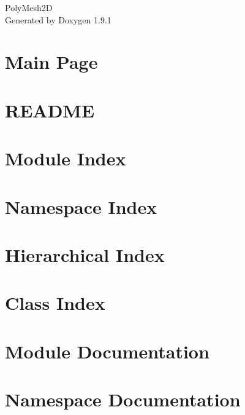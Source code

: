 \let\mypdfximage\pdfximage\def\pdfximage{\immediate\mypdfximage}\documentclass[twoside]{book}
\newcommand{\+}{\discretionary{\mbox{\scriptsize$\hookleftarrow$}}{}{}}
\newcommand{\clearemptydoublepage}{%
  \newpage{\pagestyle{empty}\cleardoublepage}%
}
\begin{document}
\raggedbottom

\hypersetup{pageanchor=false,
             bookmarksnumbered=true,
             pdfencoding=unicode
            }
\begin{titlepage}
\vspace*{7cm}
\begin{center}%
{\Large Poly\+Mesh2D }\\
\vspace*{1cm}
{\large Generated by Doxygen 1.9.1}\\
\end{center}
\end{titlepage}
\clearemptydoublepage
{}
\tableofcontents
\clearemptydoublepage
{}
\hypersetup{pageanchor=true}

\chapter{Main Page}
\label{index}\hypertarget{index}{}
\chapter{README}
\label{md_README}

\chapter{Module Index}

\chapter{Namespace Index}

\chapter{Hierarchical Index}

\chapter{Class Index}

\chapter{Module Documentation}




\chapter{Namespace Documentation}





\end{document}
